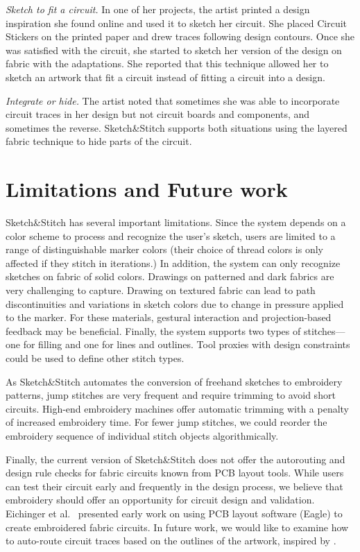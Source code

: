 \documentclass[header.tex]{subfiles}
\begin{document}
\textit{Sketch to fit a circuit.} In one of her projects, the artist printed a design inspiration she found online and used it to sketch her circuit. She placed Circuit Stickers on the printed paper and drew traces following design contours. Once she was satisfied with the circuit, she started to sketch her version of the design on fabric with the adaptations. She reported that this technique allowed her to sketch an artwork that fit a circuit instead of fitting a circuit into a design.

\textit{Integrate or hide.} The artist noted that sometimes she was able to incorporate circuit traces in her design but not circuit boards and components, and sometimes the reverse. Sketch\&Stitch supports both situations using the layered fabric technique to hide parts of the circuit.


\section{Limitations and Future work}

Sketch\&Stitch has several important limitations. Since the system depends on a color scheme to process and recognize the user's sketch, users are limited to a range of distinguishable marker colors (their choice of thread colors is only affected if they stitch in iterations.)
In addition, the system can only recognize sketches on fabric of solid colors. Drawings on patterned and dark fabrics are very challenging to capture.  
Drawing on textured fabric can lead to path discontinuities and variations in sketch colors due to change in pressure applied to the marker. For these materials, gestural interaction \cite{} and projection-based feedback \cite{} may be beneficial. Finally, the system supports two types of stitches---one for filling and one for lines and outlines. Tool proxies with design constraints \cite{mueller2012interactive} could be used to define other stitch types.


As Sketch\&Stitch automates the conversion of freehand sketches to embroidery patterns, jump stitches are very frequent and require trimming to avoid short circuits. High-end embroidery machines offer automatic trimming with a penalty of increased embroidery time. For fewer jump stitches, we could reorder the embroidery sequence of individual stitch objects algorithmically.

Finally, the current version of Sketch\&Stitch does not offer the autorouting and design rule checks for fabric circuits known from PCB layout tools. While users can test their circuit early and frequently in the design process, we believe that embroidery should offer an opportunity for circuit design and validation. Eichinger et al.\ \cite{eichinger2007using} presented early work on using PCB layout software (Eagle) to create embroidered fabric circuits. 
In future work, we would like to examine how to auto-route circuit traces based on the outlines of the artwork, inspired by \cite{savage2014series}.
\end{document}
